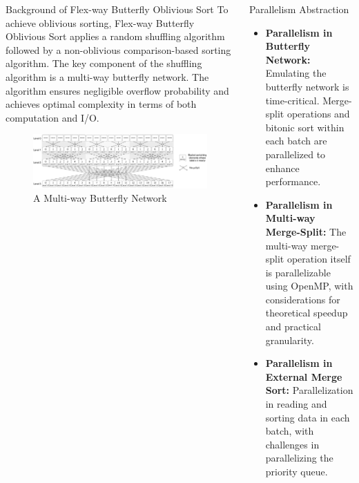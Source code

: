 \documentclass[final,hyperref={pdfpagelabels=false}]{beamer}
\begin{document}
\begin{frame}
\begin{columns}[t]
\begin{column}{.30\linewidth}
      \begin{block}{Background of Flex-way Butterfly Oblivious Sort}
        To achieve oblivious sorting, Flex-way Butterfly Oblivious Sort applies a random shuffling algorithm followed by a non-oblivious comparison-based sorting algorithm. The key component of the shuffling algorithm is a multi-way butterfly network. The algorithm ensures negligible overflow probability and achieves optimal complexity in terms of both computation and I/O.
        \begin{figure}
          \includegraphics[width=\linewidth]{assets/multi-way-butterfly.png}
          \caption{A Multi-way Butterfly Network}
        \end{figure}
      \end{block}

    \end{column}

    \begin{column}{.30\linewidth}

      \begin{block}{Parallelism Abstraction}
        \begin{itemize}
          \item \textbf{Parallelism in Butterfly Network:} Emulating the butterfly network is time-critical. Merge-split operations and bitonic sort within each batch are parallelized to enhance performance.
          \item \textbf{Parallelism in Multi-way Merge-Split:} The multi-way merge-split operation itself is parallelizable using OpenMP, with considerations for theoretical speedup and practical granularity.
          \item \textbf{Parallelism in External Merge Sort:} Parallelization in reading and sorting data in each batch, with challenges in parallelizing the priority queue.
        \end{itemize}
      \end{block}


\end{column}
\end{columns}
\end{frame}
\end{document}

